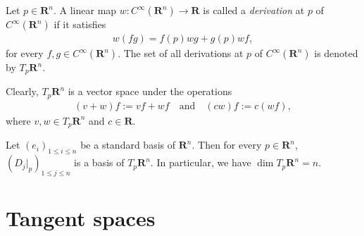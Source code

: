 \begin{definition}
    Let $p \in \mathbf{R}^n$. A linear map $w : C^\infty(\mathbf{R}^n) \to \mathbf{R}$ is called a \emph{derivation} at $p$ of $C^\infty(\mathbf{R}^n)$ if it satisfies
    \begin{align*}
        w(fg) = f(p)w g + g(p)w f,
    \end{align*}
    for every $f, g \in C^\infty(\mathbf{R}^n)$. The set of all derivations at $p$ of $C^\infty(\mathbf{R}^n)$ is denoted by $T_p\mathbf{R}^n$.
\end{definition}

Clearly, $T_p\mathbf{R}^n$ is a vector space under the operations
    \begin{align*}
        (v + w)f := v f + w f
        \quad\text{and}\quad
        (cw)f := c(w f),
    \end{align*}
where $v, w \in T_p\mathbf{R}^n$ and $c \in \mathbf{R}$.

\begin{proposition}\label{lem:basis of tangent space on R^n}
    Let $(e_i)_{1 \leq i \leq n}$ be a standard basis of $\mathbf{R}^n$. Then for every $p \in \mathbf{R}^n$, $(D_{j}|_p)_{1 \leq j \leq n}$ is a basis of $T_p\mathbf{R}^n$. In particular, we have $\dim{T_p\mathbf{R}^n} = n$.
\end{proposition}

\begin{comment}
\begin{proof}
    We verify that $(D_{e_j}|_p)_{1 \leq j \leq n}$ spans $T_p\mathbf{R}^n$. Since $p$ can be written as $p = a_je_j$ for $a_j \in \mathbf{R}$. Let $f \in C^\infty(\mathbf{R}^n)$. By Taylor's theorem, we have
    \begin{align*}
        f(x) = f(p) + \sum_{j = 1}^{n}D_{e_j}f(p)(x_j - p_j) + \sum_{i, j = 1}^{n}(x_i - p_i)(x_j - p_j)\int_{0}^{1}(1 - t)D_{e_i}D_{e_j}f(p + t(x - p))dt.
    \end{align*}
    Then
    \begin{align*}
        wf &= w(f(p)) + \sum_{j = 1}^{n}w((x_j - p_j)D_{e_j}|_pf)\\
        &= \sum_{j = 1}^{n}(w(x_j) - w(a_j))D_{e_j}|_pf\\
        &= \sum_{j = 1}^{n}w(x_j)D_{e_j}|_pf.
    \end{align*}
\end{proof}
\end{comment}


\section{Tangent spaces}

